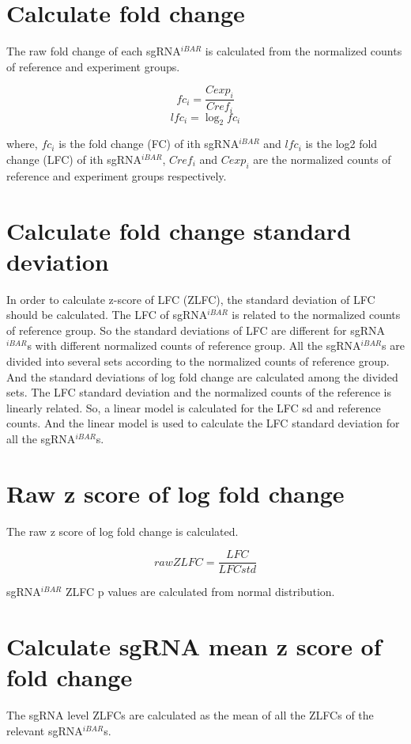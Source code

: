 \documentclass[11pt, a4paper]{article}
\begin{document}
\section{Calculate fold change}

The raw fold change of each sgRNA$^{iBAR}$ is calculated from the
normalized counts of reference and experiment groups.

$$fc_{i} = \frac{Cexp_{i}}{Cref_{i}}$$
$$lfc_{i} = \log_{2}fc_{i}$$

where, $fc_{i}$ is the fold change (FC) of ith sgRNA$^{iBAR}$ and
$lfc_{i}$ is the log2 fold change (LFC) of ith sgRNA$^{iBAR}$,
$Cref_{i}$ and $Cexp_{i}$ are the normalized counts of reference
and experiment groups respectively.

\section{Calculate fold change standard deviation}

In order to calculate z-score of LFC (ZLFC), the standard deviation of
LFC should be calculated. The LFC of sgRNA$^{iBAR}$ is related to the
normalized counts of reference group. So the standard deviations of
LFC are different for sgRNA$^{iBAR}$s with different normalized counts
of reference group. All the sgRNA$^{iBAR}$s are divided into several
sets according to the normalized counts of reference group. And the
standard deviations of log fold change are calculated among the
divided sets. The LFC standard deviation and the normalized counts of
the reference is linearly related. So, a linear model is calculated
for the LFC sd and reference counts. And the linear model is used to
calculate the LFC standard deviation for all the sgRNA$^{iBAR}$s.

\section{Raw z score of log fold change}

The raw z score of log fold change is calculated.

$$raw ZLFC = \frac{LFC}{LFC std}$$

sgRNA$^{iBAR}$ ZLFC p values are calculated from normal distribution.

\section{Calculate sgRNA mean z score of fold change}

The sgRNA level ZLFCs are calculated as the mean of all the ZLFCs of
the relevant sgRNA$^{iBAR}$s.
\end{document}
